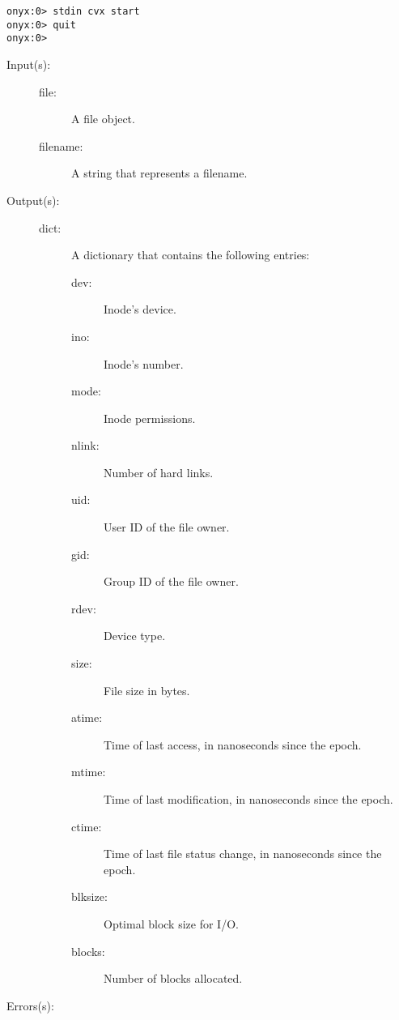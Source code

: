 \begin{description}
\begin{description}
\begin{verbatim}
onyx:0> stdin cvx start
onyx:0> quit
onyx:0>
		\end{verbatim}
	\end{description}
\label{systemdict:status}
\item[{\onyxop{file/filename}{status}{dict}}: ]
	\begin{description}\item[]
	\item[Input(s): ]
		\begin{description}\item[]
		\item[file: ]
			A file object.
		\item[filename: ]
			A string that represents a filename.
		\end{description}
	\item[Output(s): ]
		\begin{description}\item[]
		\item[dict: ]
			A dictionary that contains the following entries:
			\begin{description}%
			\item[dev: ]
				Inode's device.
			\item[ino: ]
				Inode's number.
			\item[mode: ]
				Inode permissions.
			\item[nlink: ]
				Number of hard links.
			\item[uid: ]
				User ID of the file owner.
			\item[gid: ]
				Group ID of the file owner.
			\item[rdev: ]
				Device type.
			\item[size: ]
				File size in bytes.
			\item[atime: ]
				Time of last access, in nanoseconds since the
				epoch.
			\item[mtime: ]
				Time of last modification, in nanoseconds since
				the epoch.
			\item[ctime: ]
				Time of last file status change, in nanoseconds
				since the epoch.
			\item[blksize: ]
				Optimal block size for I/O.
			\item[blocks: ]
				Number of blocks allocated.
			\end{description}
		\end{description}
	\item[Errors(s): ]
		\begin{description}\item[]

\end{description}
\end{description}
\end{description}
